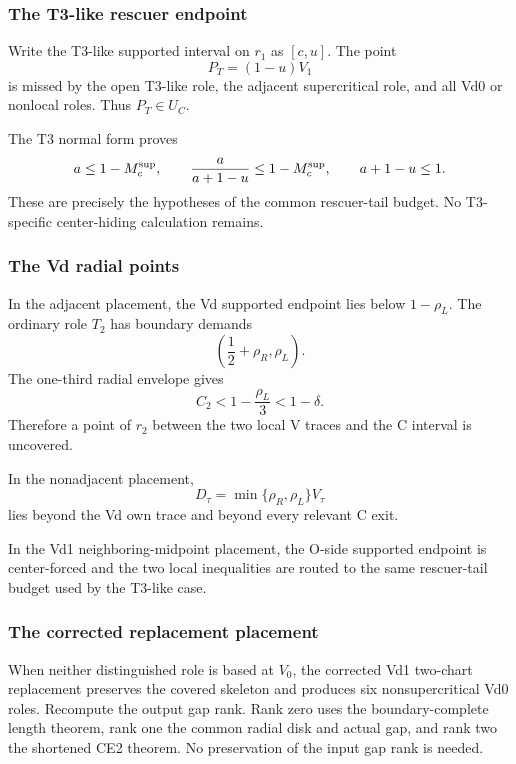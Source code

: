 \subsubsection{The T3-like rescuer endpoint}

Write the T3-like supported interval on $r_1$ as $[c,u]$.  The point
\[
 P_T=(1-u)V_1
\]
is missed by the open T3-like role, the adjacent supercritical role, and all
Vd0 or nonlocal roles.  Thus $P_T\in U_C$.

The T3 normal form proves
\[
 a\le1-M_c^{\rm sup},
 \qquad
 \frac{a}{a+1-u}\le1-M_c^{\rm sup},
 \qquad
 a+1-u\le1.
\]
These are precisely the hypotheses of the common rescuer-tail budget.  No
T3-specific center-hiding calculation remains.

\subsubsection{The Vd radial points}

In the adjacent placement, the Vd supported endpoint lies below
$1-\rho_L$.  The ordinary role $T_2$ has boundary demands
\[
 \left(\frac12+\rho_R,\rho_L\right).
\]
The one-third radial envelope gives
\[
 C_2<1-\frac{\rho_L}{3}<1-\delta.
\]
Therefore a point of $r_2$ between the two local V traces and the C interval
is uncovered.

In the nonadjacent placement,
\[
 D_\tau=\min\{\rho_R,\rho_L\}V_\tau
\]
lies beyond the Vd own trace and beyond every relevant C exit.

In the Vd1 neighboring-midpoint placement, the O-side supported endpoint is
center-forced and the two local inequalities are routed to the same
rescuer-tail budget used by the T3-like case.

\subsubsection{The corrected replacement placement}

When neither distinguished role is based at $V_0$, the corrected Vd1
two-chart replacement preserves the covered skeleton and produces six
nonsupercritical Vd0 roles.  Recompute the output gap rank.  Rank zero uses
the boundary-complete length theorem, rank one the common radial disk and
actual gap, and rank two the shortened CE2 theorem.  No preservation of the
input gap rank is needed.

